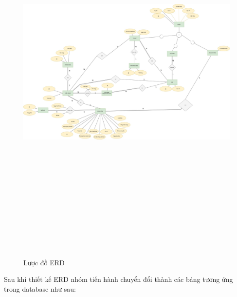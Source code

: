 		\begin{figure}[!ht]
			\includegraphics[angle=90, width=15cm, height=20cm]{Images/ERD.jpg}
			\centering
			\linebreak
			\caption{Lược đồ ERD}
		\end{figure}
	
	\newpage
	
	\newpage
	
	Sau khi thiết kế ERD nhóm tiến hành chuyển đổi thành các bảng tương ứng trong database như sau:
	
